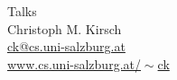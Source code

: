 \documentclass[a4paper]{article}
\begin{document}


\begin{center}
{\sc \Large Talks} \\[5mm]
{\sc \large Christoph M. Kirsch} \\[2mm]
\href{mailto:ck@cs.uni-salzburg.at}{ck@cs.uni-salzburg.at} \\
\href{https://www.cs.uni-salzburg.at/~ck}{www.cs.uni-salzburg.at/$\!\sim$ck}
\end{center}


\end{document}
